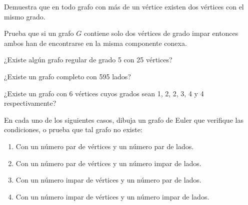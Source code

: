 \begin{ejercicio}\label{ej:1.9}
    Demuestra que en todo grafo con más de un vértice existen dos vértices con el mismo grado.
\end{ejercicio}

\begin{ejercicio}\label{ej:1.10}
    Prueba que si un grafo $G$ contiene solo dos vértices de grado impar entonces ambos han de encontrarse en la misma componente conexa.
\end{ejercicio}

\begin{ejercicio}\label{ej:1.11}
    ¿Existe algún grafo regular de grado 5 con 25 vértices?
\end{ejercicio}

\begin{ejercicio}\label{ej:1.12}
    ¿Existe un grafo completo con 595 lados?
\end{ejercicio}

\begin{ejercicio}\label{ej:1.13}
    ¿Existe un grafo con 6 vértices cuyos grados sean 1, 2, 2, 3, 4 y 4 respectivamente?
\end{ejercicio}

\begin{ejercicio}\label{ej:1.14}
    En cada uno de los siguientes casos, dibuja un grafo de Euler que verifique las condiciones, o prueba que tal grafo no existe:
    \begin{enumerate}
        \item Con un número par de vértices y un número par de lados.
        \item Con un número par de vértices y un número impar de lados.
        \item Con un número impar de vértices y un número par de lados.
        \item Con un número impar de vértices y un número impar de lados.
    \end{enumerate}
\end{ejercicio}

